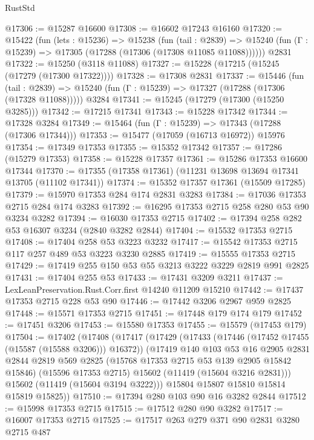 \begin{lexlean}{RustStd}
\begin{coremodule}
@17306 := @15287 @16600
@17308 := @16602 @17243 @16160
@17320 := @15422
    (fun (lets : @15236) =>
    @15238
      (fun (tail : @2839) =>
      @15240 (fun (Γ : @15239) => @17305 (@17288 (@17306 (@17308 @11085 @11088))))))
    @2831
@17322 := @15250 (@3118 @11088)
@17327 := @15228 (@17215 (@15245 (@17279 (@17300 @17322))))
@17328 := @17308 @2831
@17337 := @15446
    (fun (tail : @2839) => @15240 (fun (Γ : @15239) => @17327 (@17288 (@17306 (@17328 @11088)))))
    @3284
@17341 := @15245 (@17279 (@17300 (@15250 @3285)))
@17342 := @17215 @17341
@17343 := @15228 @17342
@17344 := @17328 @3284
@17349 := @15464 (fun (Γ : @15239) => @17343 (@17288 (@17306 @17344)))
@17353 := @15477 (@17059 (@16713 @16972)) @15976
@17354 := @17349 @17353
@17355 := @15352 @17342
@17357 := @17286 (@15279 @17353)
@17358 := @15228 @17357
@17361 := @15286 @17353 @16600 @17344
@17370 := @17355 (@17358 @17361) (@11231 @13698 @13694 @17341 @13705 (@11102 @17341))
@17374 := @15352 @17357 @17361 (@15509 @17285)
@17379 := @15970 @17353 @284 @174 @2831 @3283
@17384 := @17036 @17353 @2715 @284 @174 @3283
@17392 := @16295 @17353 @2715 @258 @280 @53 @90 @3234 @3282
@17394 := @16030 @17353 @2715
@17402 := @17394 @258 @282 @53 @16307 @3234 (@2840 @3282 @2844)
@17404 := @15532 @17353 @2715
@17408 := @17404 @258 @53 @3223 @3232
@17417 := @15542 @17353 @2715 @117 @257 @489 @53 @3223 @3230 @2885
@17419 := @15555 @17353 @2715
@17429 := @17419 @255 @150 @53 @55 @3213 @3222 @3229 @2819 @991 @2825
@17431 := @17404 @255 @53
@17433 := @17431 @3209 @3211
@17437 := LexLeanPreservation.Rust.Corr.first @14240 @11209 @15210
@17442 := @17437 @17353 @2715 @228 @53 @90
@17446 := @17442 @3206 @2967 @959 @2825
@17448 := @15571 @17353 @2715
@17451 := @17448 @179 @174 @179
@17452 := @17451 @3206
@17453 := @15580 @17353
@17455 := @15579 (@17453 @179)
@17504 := @17402
    (@17408
      (@17417
        (@17429
          (@17433 (@17446 (@17452 @17455 (@15587 (@15588 @3206))) @16372))
          (@17419
            @140
            @103
            @53
            @16
            @2905
            @2831
            @2844
            @2819
            @569
            @2825
            (@15768 @17353 @2715 @53 @139 @2905 @15842 @15846)
            (@15596 @17353 @2715)
            @15602
            (@11419 (@15604 @3216 @2831)))
          @15602
          (@11419 (@15604 @3194 @3222)))
        @15804
        @15807
        @15810
        @15814
        @15819
        @15825))
@17510 := @17394 @280 @103 @90 @16 @3282 @2844
@17512 := @15998 @17353 @2715
@17515 := @17512 @280 @90 @3282
@17517 := @16007 @17353 @2715
@17525 := @17517 @263 @279 @371 @90 @2831 @3280 @2715 @487

\end{coremodule}
\end{lexlean}
